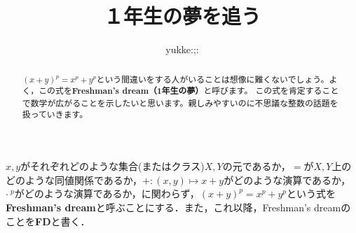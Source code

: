 \documentclass[dvipdfmx]{jlreq}
\title{１年生の夢を追う}
\date{}
\author{yukke:;:}
\newenvironment{dfn}{\begin{mydefinition}}{\end{mydefinition}}
\theoremstyle{myproposition}
\begin{document}
\maketitle

\begin{abstract}
    $(x + y)^p = x^p + y^p$という間違いをする人がいることは想像に難くないでしょう。よく，この式を\textbf{Freshman's dream（1年生の夢）}と呼びます。
    この式を肯定することで数学が広がることを示したいと思います。親しみやすいのに不思議な整数の話題を扱っていきます。
\end{abstract}

\begin{dfn} \label{freshman}
    $x,y$がそれぞれどのような集合(またはクラス)$X,Y$の元であるか，$=$が$X,Y$上のどのような同値関係であるか，$+\colon(x,y)\mapsto x+y$がどのような演算であるか，$\cdot~^p$がどのような演算であるか，に関わらず，$(x + y)^p = x^p + y^p$という式を\textbf{Freshman's dream}と呼ぶことにする．また，これ以降，Freshman's dreamのことを\textbf{\textsf{FD}}と書く．
\end{dfn}

\tableofcontents












\end{document}
